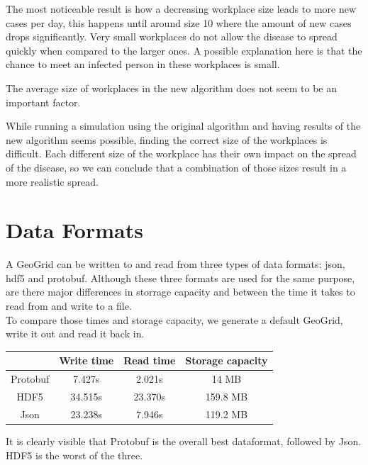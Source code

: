 \documentclass[runningheads]{llncs}
\begin{document}
The most noticeable result is how a decreasing workplace size leads to more new cases per day, this happens until around size 10 where the amount of new cases drops significantly. Very small workplaces do not allow the disease to spread quickly when compared to the larger ones. A possible explanation here is that the chance to meet an infected person in these workplaces is small.

The average size of workplaces in the new algorithm does not seem to be an important factor.

While running a simulation using the original algorithm and having results of the new algorithm seems possible, finding the correct size of the workplaces is difficult. Each different size of the workplace has their own impact on the spread of the disease, so we can conclude that a combination of those sizes result in a more realistic spread.

\newpage
\section{Data Formats}
A GeoGrid can be written to and read from three types of data formats: json, hdf5 and protobuf. Although these three formats are used for the same purpose, are there major differences in storrage capacity and between the time it takes to read from and write to a file. \\
To compare those times and storage capacity, we generate a default GeoGrid, write it out and read it back in. 

\begin{table}[H]
	\centering
	\begin{tabular}{|c|c|c|c|}
		\hline
		         & Write time & Read time & Storage capacity \\ \hline
		Protobuf & 7.427s     & 2.021s    & 14 MB             \\ \hline
		HDF5     & 34.515s    & 23.370s   & 159.8 MB          \\ \hline
		Json     & 23.238s    & 7.946s    & 119.2 MB          \\ \hline
	\end{tabular}
\end{table}

\noindent
It is clearly visible that Protobuf is the overall best dataformat, followed by Json. HDF5 is the worst of the three. 
\end{document}
